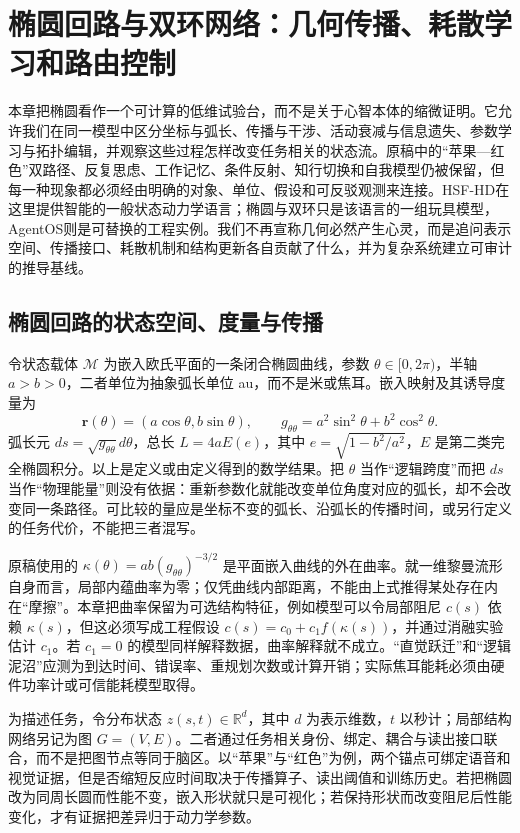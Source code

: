 \chapter{椭圆回路与双环网络：几何传播、耗散学习和路由控制}
\label{chp:cognitive_elliptic_resonator}

本章把椭圆看作一个可计算的低维试验台，而不是关于心智本体的缩微证明。它允许我们在同一模型中区分坐标与弧长、传播与干涉、活动衰减与信息遗失、参数学习与拓扑编辑，并观察这些过程怎样改变任务相关的状态流。原稿中的“苹果—红色”双路径、反复思虑、工作记忆、条件反射、知行切换和自我模型仍被保留，但每一种现象都必须经由明确的对象、单位、假设和可反驳观测来连接。HSF-HD在这里提供智能的一般状态动力学语言；椭圆与双环只是该语言的一组玩具模型，AgentOS则是可替换的工程实例。我们不再宣称几何必然产生心灵，而是追问表示空间、传播接口、耗散机制和结构更新各自贡献了什么，并为复杂系统建立可审计的推导基线。

\section{椭圆回路的状态空间、度量与传播}
\label{sec:elliptic_geometry_metric_curvature}

令状态载体 $\mathcal M$ 为嵌入欧氏平面的一条闭合椭圆曲线，参数 $\theta\in[0,2\pi)$，半轴 $a>b>0$，二者单位为抽象弧长单位 au，而不是米或焦耳。嵌入映射及其诱导度量为
\begin{equation}
 \mathbf r(\theta)=(a\cos\theta,b\sin\theta),\qquad
 g_{\theta\theta}=a^2\sin^2\theta+b^2\cos^2\theta .
\end{equation}
弧长元 $ds=\sqrt{g_{\theta\theta}}d\theta$，总长 $L=4aE(e)$，其中 $e=\sqrt{1-b^2/a^2}$，$E$ 是第二类完全椭圆积分。以上是定义或由定义得到的数学结果。把 $\theta$ 当作“逻辑跨度”而把 $ds$ 当作“物理能量”则没有依据：重新参数化就能改变单位角度对应的弧长，却不会改变同一条路径。可比较的量应是坐标不变的弧长、沿弧长的传播时间，或另行定义的任务代价，不能把三者混写。

原稿使用的 $\kappa(\theta)=ab(g_{\theta\theta})^{-3/2}$ 是平面嵌入曲线的外在曲率。就一维黎曼流形自身而言，局部内蕴曲率为零；仅凭曲线内部距离，不能由上式推得某处存在内在“摩擦”。本章把曲率保留为可选结构特征，例如模型可以令局部阻尼 $c(s)$ 依赖 $\kappa(s)$，但这必须写成工程假设 $c(s)=c_0+c_1f(\kappa(s))$，并通过消融实验估计 $c_1$。若 $c_1=0$ 的模型同样解释数据，曲率解释就不成立。“直觉跃迁”和“逻辑泥沼”应测为到达时间、错误率、重规划次数或计算开销；实际焦耳能耗必须由硬件功率计或可信能耗模型取得。

为描述任务，令分布状态 $z(s,t)\in\mathbb R^d$，其中 $d$ 为表示维数，$t$ 以秒计；局部结构网络另记为图 $G=(V,E)$。二者通过任务相关身份、绑定、耦合与读出接口联合，而不是把图节点等同于脑区。以“苹果”与“红色”为例，两个锚点可绑定语音和视觉证据，但是否缩短反应时间取决于传播算子、读出阈值和训练历史。若把椭圆改为同周长圆而性能不变，嵌入形状就只是可视化；若保持形状而改变阻尼后性能变化，才有证据把差异归于动力学参数。

